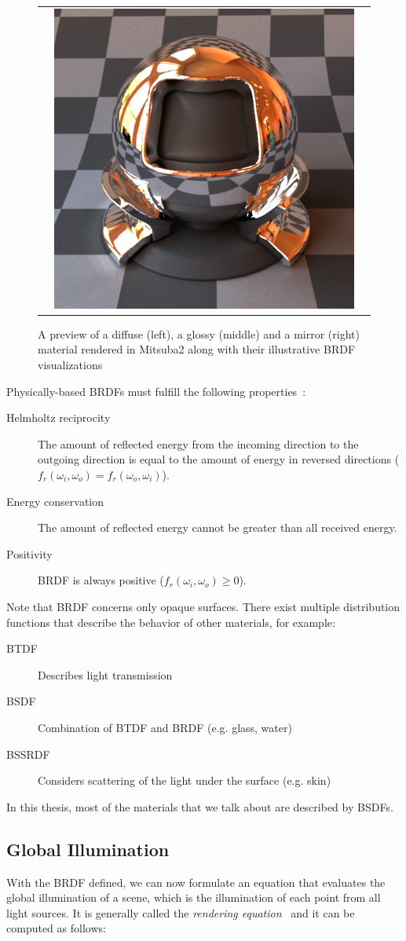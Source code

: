 \begin{figure}[httpb]
\begin{tabular}{ccc}
		&
		\includegraphics[width=.3\linewidth]{img/brdf_mirror.png}
	\end{tabular}
	\caption{A preview of a diffuse (left), a glossy (middle) and a mirror (right) material rendered in Mitsuba2 along with their illustrative BRDF visualizations}
	\label{fig:compare_brdf}
\end{figure}


Physically-based BRDFs must fulfill the following properties~\citealp{duvenhage2013numerical}:
\begin{description}
	\item[Helmholtz reciprocity] The amount of reflected energy from the incoming direction to the outgoing direction is equal to the amount of energy in reversed directions ($f_r(\omega_i,\omega_o)=f_r(\omega_o,\omega_i)$).
	\item[Energy conservation] The amount of reflected energy cannot be greater than all received energy.
	\item[Positivity] BRDF is always positive ($f_r(\omega_i,\omega_o)\ge0$).
\end{description}

Note that BRDF concerns only opaque surfaces. There exist multiple distribution functions that describe the behavior of other materials, for example:
\begin{description}
	\item[BTDF] Describes light transmission
	\item[BSDF] Combination of BTDF and BRDF (e.g. glass, water)
	\item[BSSRDF] Considers scattering of the light under the surface (e.g. skin)
\end{description}

In this thesis, most of the materials that we talk about are described by BSDFs.

\subsection{Global Illumination}

With the BRDF defined, we can now formulate an equation that evaluates the global illumination of a scene, which is the illumination of each point from all light sources. It is generally called the \emph{rendering equation}~\cite{kajiya1986rendering} and it can be computed as follows:

